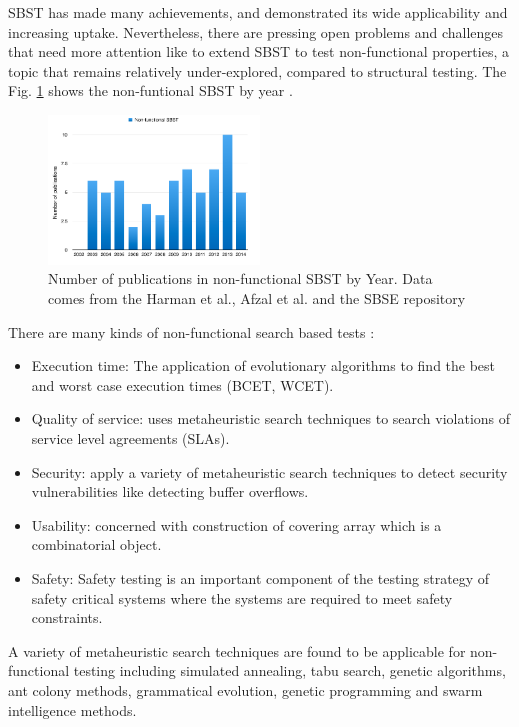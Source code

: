 \documentclass[review]{elsarticle}
\begin{document}
SBST has made many achievements, and demonstrated its wide applicability and increasing uptake. Nevertheless, there are pressing open problems and challenges that need more attention like to extend SBST to test non-functional properties, a topic that remains relatively under-explored, compared to structural testing. The Fig. \ref{fig:nonfunctional} shows the non-funtional SBST by year \cite{Aleti2016} \cite{Harman2015}. 

\begin{figure}[h]
\includegraphics[width=0.5\textwidth]{./images/nonfunctional.png}
\caption{Number of publications in non-functional SBST by Year. Data comes from the Harman et al., Afzal et al. and the SBSE repository  \cite{Afzal2009a} \cite{Harman2015} }
\label{fig:nonfunctional}
\end{figure}

There are many kinds of non-functional search based tests  \cite{Afzal2009a}:

\begin{itemize}
\item Execution time: The application of evolutionary algorithms to find the best and worst case execution times (BCET, WCET).
\item Quality of service: uses metaheuristic search techniques to search violations of service level agreements (SLAs).
\item Security: apply a variety of metaheuristic search techniques  to detect security vulnerabilities like detecting buffer overflows.
\item Usability: concerned with construction of covering array which is a combinatorial object.
\item Safety: Safety testing is an important component of the testing strategy of safety critical systems where the systems are required to meet safety constraints.
\end{itemize}

A variety of metaheuristic search techniques are found to be applicable for non-functional testing including simulated annealing, tabu search, genetic algorithms, ant colony methods, grammatical evolution, genetic programming and swarm intelligence methods.
\end{document}
